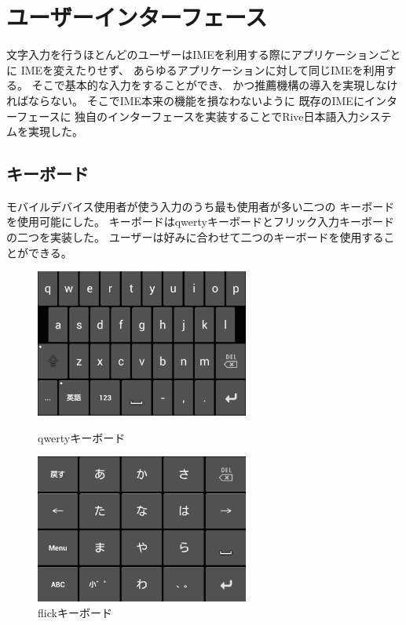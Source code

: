 \chapter{ユーザーインターフェース}
\label{userinterface}

文字入力を行うほとんどのユーザーはIMEを利用する際にアプリケーションごとに
IMEを変えたりせず、
あらゆるアプリケーションに対して同じIMEを利用する。
そこで基本的な入力をすることができ、
かつ推薦機構の導入を実現しなければならない。
そこでIME本来の機能を損なわないように
既存のIMEにインターフェースに
独自のインターフェースを実装することでRive日本語入力システムを実現した。

\section{キーボード}
モバイルデバイス使用者が使う入力のうち最も使用者が多い二つの
キーボードを使用可能にした。
キーボードはqwertyキーボードとフリック入力キーボードの二つを実装した。
ユーザーは好みに合わせて二つのキーボードを使用することができる。

\begin{figure}
  \begin{minipage}{0.5\hsize}
    \begin{center}
      \includegraphics[width=7cm,bb=0 0 417 290]{images/qwerty.png}
    \end{center}
    \caption{qwertyキーボード}
    \label{fig:qwerty}
  \end{minipage}
  \begin{minipage}{0.5\hsize}
    \begin{center}
      \includegraphics[width=7cm,bb=0 0 415 290]{images/flick.png}
    \end{center}
    \caption{flickキーボード}
    \label{fig:flick}
  \end{minipage}
\end{figure}

